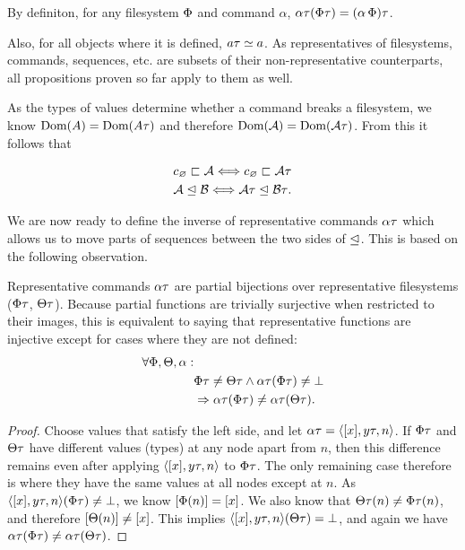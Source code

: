 By definiton,
for any filesystem $\Phi$ and command $\alpha$, 
$\alpha\tau(\Phi\tau) = (\alpha\,\Phi)\tau$.


Also, for all objects where it is defined, $a\tau\simeq a$.
As representatives of filesystems, commands, sequences, etc.
are subsets of their non-representative counterparts, 
all propositions proven so far apply to them as well.


As the types of values determine whether a command breaks a filesystem,
we know $\textrm{Dom}({A})=\textrm{Dom}({A\tau})$ and therefore $\textrm{Dom}({\mathcal{A}})=\textrm{Dom}({\mathcal{A}\tau})$.
From this it follows that

\begin{mycor}\label{repr_works_is_same}
\begin{gather*}
c_\varnothing\sqsubset{\mathcal{A}} \Longleftrightarrow c_\varnothing\sqsubset{\mathcal{A}\tau} \\
{\mathcal{A}}\trianglelefteq{\mathcal{B}} \Longleftrightarrow {\mathcal{A}\tau}\trianglelefteq{\mathcal{B}\tau}.
\end{gather*}
\end{mycor}


We are now ready to define the inverse of representative commands $\alpha\tau$
which allows us to move parts of sequences between the
two sides of $\trianglelefteq$.
This is based on the following observation.

\begin{mylem}\label{repr_comm_inject}
Representative commands $\alpha\tau$ are partial bijections over representative filesystems
($\Phi\tau$, $\Theta\tau$).
Because partial functions are trivially surjective when restricted to their images, this is
equivalent to saying that representative functions are injective except for cases
where they are not defined:
\begin{align*}
\forall\Phi,\Theta,\alpha:& \\
& \Phi\tau\neq\Theta\tau \wedge \alpha\tau(\Phi\tau)\neq\bot \\
& \Rightarrow \alpha\tau(\Phi\tau) \neq \alpha\tau(\Theta\tau).
\end{align*}
\end{mylem}
\begin{proof}
Choose values that satisfy the left side, and let $\alpha\tau = \langle{[x],{y}\tau,n}\rangle$.
If $\Phi\tau$ and $\Theta\tau$ have different values (types) at any node apart from $n$, then this difference remains
even after applying $\langle{[x],{y}\tau,n}\rangle$ to $\Phi\tau$. 
The only remaining case therefore is where they have the same values
at all nodes except at $n$.
As $\langle{[x],{y}\tau,n}\rangle(\Phi\tau)\neq\bot$, we know $[\Phi(n)]=[x]$.
We also know that $\Theta\tau(n)\neq\Phi\tau(n)$, and therefore
$[\Theta(n)]\neq[x]$.
This implies $\langle{[x],{y}\tau,n}\rangle(\Theta\tau)=\bot$,
and again we have $\alpha\tau(\Phi\tau) \neq \alpha\tau(\Theta\tau)$.
\end{proof}

